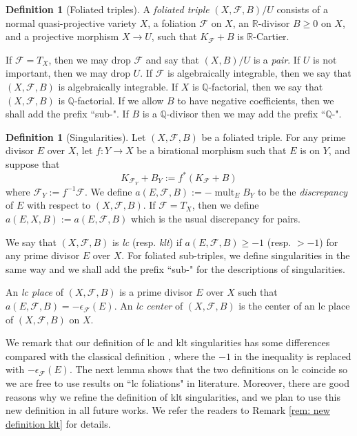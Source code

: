 \documentclass[11pt]{amsart}
\numberwithin{equation}{section}
\newcommand{\Qq}{\mathbb{Q}}
\newcommand{\Rr}{\mathbb{R}}
\newcommand{\mult}{\operatorname{mult}}
\newcommand{\Ff}{\mathcal{F}}
\theoremstyle{definition}
\newtheorem{defn}[thm]{Definition}
\theoremstyle{definition}
\theoremstyle{definition}
\begin{document}
\begin{defn}[Foliated triples]\label{defn: foliated triple}
 A \emph{foliated triple} $(X,\Ff,B)/U$ consists of a normal quasi-projective variety $X$, a foliation $\Ff$ on $X$, an $\Rr$-divisor $B\geq 0$ on $X$, and a projective morphism $X\rightarrow U$, such that $K_{\Ff}+B$ is $\mathbb R$-Cartier.
 

  If $\Ff=T_X$, then we may drop $\Ff$ and say that $(X,B)/U$ is a \emph{pair}. If $U$ is not important, then we may drop $U$. If $\Ff$ is algebraically integrable, then we say that $(X,\Ff,B)$ is algebraically integrable. If $X$ is $\Qq$-factorial, then we say that $(X,\Ff,B)$ is $\Qq$-factorial. If we allow $B$ to have negative coefficients, then we shall add the prefix ``sub-". If $B$ is a $\Qq$-divisor then we may add the prefix ``$\mathbb Q$-".
\end{defn}


\begin{defn}[Singularities]\label{defn: foliation singularity}
Let $(X,\Ff,B)$ be a foliated triple. For any prime divisor $E$ over $X$, let $f: Y\rightarrow X$ be a birational morphism such that $E$ is on $Y$, and suppose that
$$K_{\Ff_Y}+B_Y:=f^*(K_\Ff+B)$$
where $\Ff_Y:=f^{-1}\Ff$. We define $a(E,\Ff,B):=-\mult_EB_Y$ to be the \emph{discrepancy} of $E$ with respect to $(X,\Ff,B)$. If $\Ff=T_X$, then we define $a(E,X,B):=a(E,\Ff,B)$ which is the usual discrepancy for pairs.

We say that $(X,\Ff,B)$ is \emph{lc} (resp. \emph{klt}) if $a(E,\Ff,B)\geq -1$ (resp. $>-1$) for any prime divisor $E$ over $X$. For foliated sub-triples, we define singularities in the same way and we shall add the prefix ``sub-" for the descriptions of singularities.

An \emph{lc place} of $(X,\Ff,B)$ is a prime divisor $E$ over $X$ such that $a(E,\Ff,B)=-\epsilon_{\Ff}(E)$. An \emph{lc center} of $(X,\Ff,B)$ is the center of an lc place of $(X,\Ff,B)$ on $X$.

We remark that our definition of lc and klt singularities has some differences compared with the classical definition \cite{McQ08,CS20,ACSS21,CS21,CHLX23}, where the $-1$ in the inequality is replaced with $-\epsilon_{\Ff}(E)$. The next lemma shows that the two definitions on lc coincide so we are free to use results on ``lc foliations" in literature. Moreover, there are good reasons why we refine the definition of klt singularities, and we plan to use this new definition in all future works. We refer the readers to Remark \ref{rem: new definition klt} for details.
\end{defn}
\end{document}
